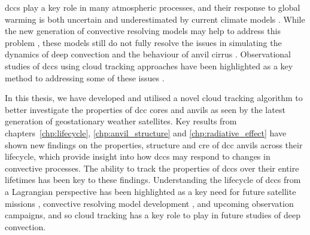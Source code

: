 \acrshort{dcc}s play a key role in many atmospheric processes, and their response to global warming is both uncertain \citep{sherwood_assessment_2020} and underestimated by current climate models \citep{hill_climate_2023}.
While the new generation of convective resolving models may help to address this problem \citep{stevens_added_2020}, these models still do not fully resolve the issues in simulating the dynamics of deep convection \citep{jeevanjee_vertical_2017} and the behaviour of anvil cirrus \citep{sullivan_ice_2021}.
Observational studies of \acrshort{dcc}s using cloud tracking approaches have been highlighted as a key method to addressing some of these issues \citep{gasparini_opinion_2023}.

In this thesis, we have developed and utilised a novel cloud tracking algorithm to better investigate the properties of \acrshort{dcc} cores and anvils as seen by the latest generation of geostationary weather satellites.
Key results from chapters~\ref{chp:lifecycle}, \ref{chp:anvil_structure} and \ref{chp:radiative_effect} have shown new findings on the properties, structure and \acrshort{cre} of \acrshort{dcc} anvils across their lifecycle, which provide insight into how \acrshort{dcc}s may respond to changes in convective processes.
The ability to track the properties of \acrshort{dcc}s over their entire lifetimes has been key to these findings.
Understanding the lifecycle of \acrshort{dcc}s from a Lagrangian perspective has been highlighted as a key need for future satellite missions \citep{vandenheever_tropical_2023}, convective resolving model development \citep{prein_kmscale_2024}, and upcoming observation campaigns, and so cloud tracking has a key role to play in future studies of deep convection.
